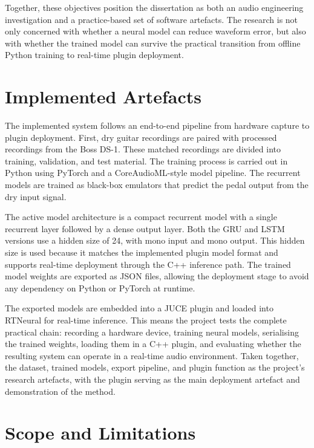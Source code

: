 Together, these objectives position the dissertation as both an audio engineering investigation and a practice-based set of software artefacts. The research is not only concerned with whether a neural model can reduce waveform error, but also with whether the trained model can survive the practical transition from offline Python training to real-time plugin deployment.

\section{Implemented Artefacts}
\label{sec:introduction-implemented-artefacts}

The implemented system follows an end-to-end pipeline from hardware capture to plugin deployment. First, dry guitar recordings are paired with processed recordings from the Boss DS-1. These matched recordings are divided into training, validation, and test material. The training process is carried out in Python using PyTorch and a CoreAudioML-style model pipeline. The recurrent models are trained as black-box emulators that predict the pedal output from the dry input signal.

The active model architecture is a compact recurrent model with a single recurrent layer followed by a dense output layer. Both the GRU and LSTM versions use a hidden size of 24, with mono input and mono output. This hidden size is used because it matches the implemented plugin model format and supports real-time deployment through the C++ inference path. The trained model weights are exported as JSON files, allowing the deployment stage to avoid any dependency on Python or PyTorch at runtime.

The exported models are embedded into a JUCE plugin and loaded into RTNeural for real-time inference. This means the project tests the complete practical chain: recording a hardware device, training neural models, serialising the trained weights, loading them in a C++ plugin, and evaluating whether the resulting system can operate in a real-time audio environment. Taken together, the dataset, trained models, export pipeline, and plugin function as the project's research artefacts, with the plugin serving as the main deployment artefact and demonstration of the method.

\section{Scope and Limitations}
\label{sec:introduction-scope-limitations}

